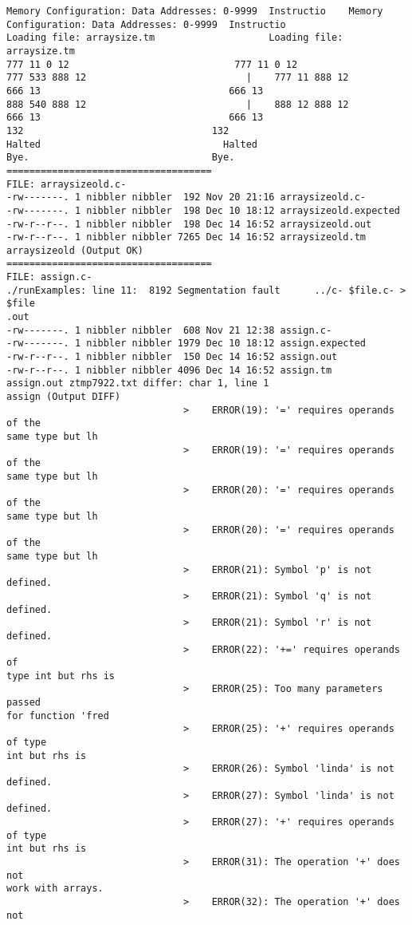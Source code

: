 \documentclass[12pt]{book}
\begin{document}
\begin{lstlisting}
Memory Configuration: Data Addresses: 0-9999  Instructio    Memory 
Configuration: Data Addresses: 0-9999  Instructio
Loading file: arraysize.tm                    Loading file: arraysize.tm
777 11 0 12                             777 11 0 12 
777 533 888 12                            |    777 11 888 12 
666 13                                 666 13 
888 540 888 12                            |    888 12 888 12 
666 13                                 666 13 
132                                 132 
Halted                                Halted
Bye.                                Bye.
====================================
FILE: arraysizeold.c-
-rw-------. 1 nibbler nibbler  192 Nov 20 21:16 arraysizeold.c-
-rw-------. 1 nibbler nibbler  198 Dec 10 18:12 arraysizeold.expected
-rw-r--r--. 1 nibbler nibbler  198 Dec 14 16:52 arraysizeold.out
-rw-r--r--. 1 nibbler nibbler 7265 Dec 14 16:52 arraysizeold.tm
arraysizeold (Output OK)
====================================
FILE: assign.c-
./runExamples: line 11:  8192 Segmentation fault      ../c- $file.c- > $file
.out
-rw-------. 1 nibbler nibbler  608 Nov 21 12:38 assign.c-
-rw-------. 1 nibbler nibbler 1979 Dec 10 18:12 assign.expected
-rw-r--r--. 1 nibbler nibbler  150 Dec 14 16:52 assign.out
-rw-r--r--. 1 nibbler nibbler 4096 Dec 14 16:52 assign.tm
assign.out ztmp7922.txt differ: char 1, line 1
assign (Output DIFF)
                               >    ERROR(19): '=' requires operands of the 
same type but lh
                               >    ERROR(19): '=' requires operands of the 
same type but lh
                               >    ERROR(20): '=' requires operands of the 
same type but lh
                               >    ERROR(20): '=' requires operands of the 
same type but lh
                               >    ERROR(21): Symbol 'p' is not defined.
                               >    ERROR(21): Symbol 'q' is not defined.
                               >    ERROR(21): Symbol 'r' is not defined.
                               >    ERROR(22): '+=' requires operands of 
type int but rhs is
                               >    ERROR(25): Too many parameters passed 
for function 'fred
                               >    ERROR(25): '+' requires operands of type
int but rhs is 
                               >    ERROR(26): Symbol 'linda' is not defined.
                               >    ERROR(27): Symbol 'linda' is not defined.
                               >    ERROR(27): '+' requires operands of type
int but rhs is 
                               >    ERROR(31): The operation '+' does not 
work with arrays.
                               >    ERROR(32): The operation '+' does not 

\end{lstlisting}
\end{document}
